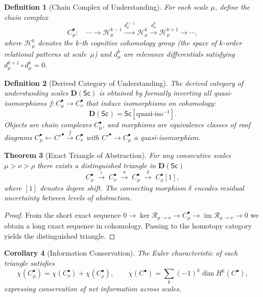 \documentclass[12pt,a4paper,twoside,openright]{book}
\newtheorem{theorem}{Theorem}
\newtheorem{definition}[theorem]{Definition}
\newtheorem{corollary}[theorem]{Corollary}
\begin{document}
\begin{definition}[Chain Complex of Understanding]
For each scale $\mu$, define the chain complex
\[
C_\mu^\bullet:
\quad
\cdots
\longrightarrow
\mathcal{H}^{k-1}_\mu
\xrightarrow{d_\mu^{k-1}}
\mathcal{H}^{k}_\mu
\xrightarrow{d_\mu^{k}}
\mathcal{H}^{k+1}_\mu
\longrightarrow
\cdots,
\]
where $\mathcal{H}^k_\mu$ denotes the $k$-th cognitive cohomology group
(the space of $k$-order relational patterns at scale~$\mu$)
and $d_\mu^{k}$ are relevance differentials satisfying $d_\mu^{k+1}\!\circ d_\mu^{k}=0$.
\end{definition}

\begin{definition}[Derived Category of Understanding]
The \emph{derived category of understanding scales} $\mathbf{D}(\mathsf{Sc})$
is obtained by formally inverting all quasi-isomorphisms
$f:C_\mu^\bullet\!\to C_\nu^\bullet$
that induce isomorphisms on cohomology:
\[
\mathbf{D}(\mathsf{Sc})
=
\mathsf{Sc}[\text{quasi-iso}^{-1}].
\]
Objects are chain complexes $C_\mu^\bullet$,
and morphisms are equivalence classes of roof diagrams
\(
C_\mu^\bullet\leftarrow C'^\bullet\xrightarrow{f}C_\nu^\bullet
\)
with $C'^\bullet\to C_\mu^\bullet$ a quasi-isomorphism.
\end{definition}

\begin{theorem}[Exact Triangle of Abstraction]
\label{thm:triangle}
For any consecutive scales $\mu>\nu>\rho$
there exists a distinguished triangle in $\mathbf{D}(\mathsf{Sc})$
\[
C_\rho^\bullet
\;\xrightarrow{\iota}\;
C_\nu^\bullet
\;\xrightarrow{\pi}\;
C_\mu^\bullet
\;\xrightarrow{\delta}\;
C_\rho^\bullet[1],
\]
where $[1]$ denotes degree shift.
The connecting morphism $\delta$ encodes residual uncertainty
between levels of abstraction.
\end{theorem}

\begin{proof}
From the short exact sequence
$0\!\to\!\ker\mathcal{R}_{\mu\to\nu}
\!\to\!C_\mu^\bullet
\!\to\!\operatorname{im}\mathcal{R}_{\mu\to\nu}\!\to\!0$
we obtain a long exact sequence in cohomology.
Passing to the homotopy category yields the distinguished triangle.
\end{proof}

\begin{corollary}[Information Conservation]
The Euler characteristic of each triangle satisfies
\[
\chi(C_\mu^\bullet)
=
\chi(C_\nu^\bullet)
+
\chi(C_\rho^\bullet),
\qquad
\chi(C^\bullet)
=\sum_k (-1)^k \dim H^k(C^\bullet),
\]
expressing conservation of net information across scales.
\end{corollary}
\end{document}
